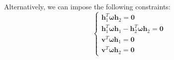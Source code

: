 Alternatively, we can impose the following constraints:
\[\begin{cases}
    \mathbf{h}_1^T\boldsymbol{\omega}\mathbf{h}_2 = \mathbf{0} \\
    \mathbf{h}_1^T\boldsymbol{\omega}\mathbf{h}_1 - \mathbf{h}_2^T\boldsymbol{\omega}\mathbf{h}_2 = \mathbf{0} \\ 
    \mathbf{v}^T\boldsymbol{\omega}\mathbf{h}_1=\mathbf{0} \\ 
    \mathbf{v}^T\boldsymbol{\omega}\mathbf{h}_2=\mathbf{0}
\end{cases}\]